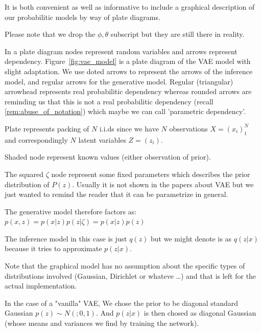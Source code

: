 \documentclass[11pt, a4paper]{report}
\theoremstyle{plain}
\theoremstyle{definition}
\theoremstyle{remark}
\begin{document}

It is both convenient as well as informative to include a graphical description
of our probabilitic models by way of plate diagrams.

Please note that we drop the $\phi, \theta$ subscript but they are still there
in reality.

In a plate diagram nodes represent random variables and arrows
represent dependency.
Figure~\ref{fig:vae_model} is a plate diagram of the VAE model with slight
adaptation. We use doted arrows to represent the arrows of the inference model,
and regular arrows for the generative model. Regular (triangular) arrowhead
represents real probabilitic dependency whereas rounded arrows are reminding us
that this is not a real probabilitic dependency (recall
\ref{rem:abuse_of_notation}) which maybe we can call 'parametric
dependency'.

Plate represents packing of $N$ i.i.ds since we have $N$ observations $X =
(x_i)_1^N$ and correspondingly $N$ latent variables $Z = (z_i)$.

Shaded node represent known values (either observation of prior).

The squared $\zeta$ node represent some fixed parameters which describes the
prior distribution of $P(z)$. Usually it is not shown in the papers about VAE
but we just wanted to remind the reader that it can be parametrize in general.

The generative model therefore factors as: $p(x,z) = p(x|z)p(z|\zeta) =
p(x|z)p(z)$

The inference model in this case is just $q(z)$ but we might denote is as
$q(z|x)$ because it tries to approximate $p(z|x)$.

Note that the graphical model has no assumption about the specific types of
distributions involved (Gaussian, Dirichlet or whateve \dots) and that is left
for the actual implementation.

In the case of a "vanilla" VAE, We chose the prior to be diagonal standard Gaussian
$p(z) \sim N(;0,1)$. And $p(z | x)$ is then chosed as diagonal Gaussian (whose
means and variances we find by training the network).
\end{document}

